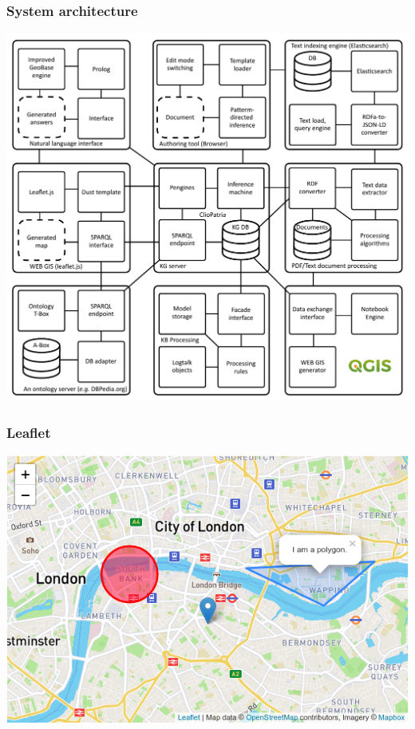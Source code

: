 \documentclass[10pt]{beamer}
\begin{document}
\begin{frame}
  \frametitle{System architecture}
  \centering
  \includegraphics[width=0.8\linewidth]{architecture.pdf}
\end{frame}

\begin{frame}
  \frametitle{Leaflet}
  \centering
  \includegraphics[width=0.8\linewidth]{leaflet.png}
\end{frame}
\end{document}
